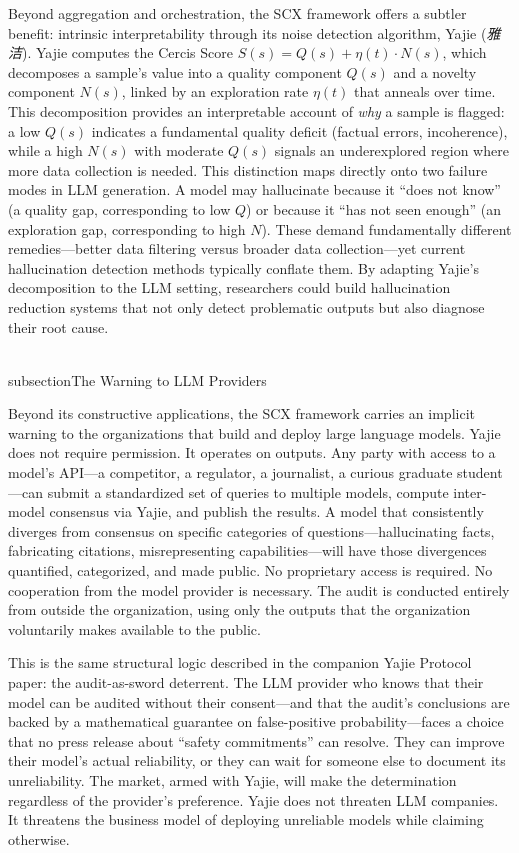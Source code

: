 \documentclass[11pt,twocolumn]{article}
\begin{document}
Beyond aggregation and orchestration, the SCX framework offers a subtler benefit: intrinsic interpretability through its noise detection algorithm, Yajie (\emph{雅洁}). Yajie computes the Cercis Score $S(s) = Q(s) + \eta(t) \cdot N(s)$, which decomposes a sample's value into a quality component $Q(s)$ and a novelty component $N(s)$, linked by an exploration rate $\eta(t)$ that anneals over time. This decomposition provides an interpretable account of \textit{why} a sample is flagged: a low $Q(s)$ indicates a fundamental quality deficit (factual errors, incoherence), while a high $N(s)$ with moderate $Q(s)$ signals an underexplored region where more data collection is needed. This distinction maps directly onto two failure modes in LLM generation. A model may hallucinate because it ``does not know'' (a quality gap, corresponding to low $Q$) or because it ``has not seen enough'' (an exploration gap, corresponding to high $N$). These demand fundamentally different remedies---better data filtering versus broader data collection---yet current hallucination detection methods typically conflate them. By adapting Yajie's decomposition to the LLM setting, researchers could build hallucination reduction systems that not only detect problematic outputs but also diagnose their root cause.

\\subsection{The Warning to LLM Providers}

Beyond its constructive applications, the SCX framework carries an implicit warning to the organizations that build and deploy large language models. Yajie does not require permission. It operates on outputs. Any party with access to a model's API—a competitor, a regulator, a journalist, a curious graduate student—can submit a standardized set of queries to multiple models, compute inter-model consensus via Yajie, and publish the results. A model that consistently diverges from consensus on specific categories of questions—hallucinating facts, fabricating citations, misrepresenting capabilities—will have those divergences quantified, categorized, and made public. No proprietary access is required. No cooperation from the model provider is necessary. The audit is conducted entirely from outside the organization, using only the outputs that the organization voluntarily makes available to the public.

This is the same structural logic described in the companion Yajie Protocol paper: the audit-as-sword deterrent. The LLM provider who knows that their model can be audited without their consent—and that the audit's conclusions are backed by a mathematical guarantee on false-positive probability—faces a choice that no press release about ``safety commitments'' can resolve. They can improve their model's actual reliability, or they can wait for someone else to document its unreliability. The market, armed with Yajie, will make the determination regardless of the provider's preference. Yajie does not threaten LLM companies. It threatens the business model of deploying unreliable models while claiming otherwise.
\end{document}
